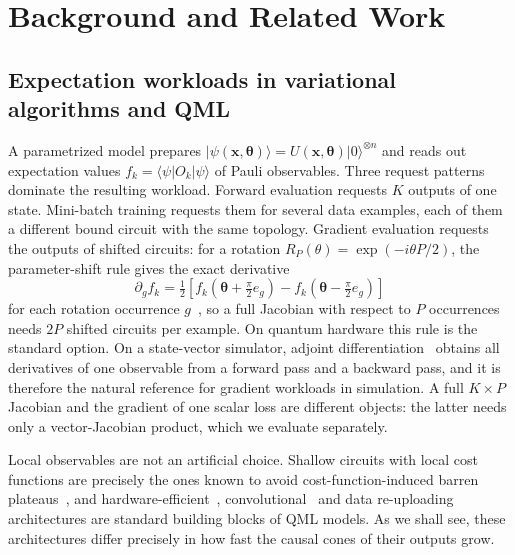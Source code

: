 \section{Background and Related Work}
\label{sec:background}
\subsection{Expectation workloads in variational algorithms and QML}
A parametrized model prepares $|\psi(\mathbf{x},\boldsymbol\theta)\rangle=U(\mathbf{x},\boldsymbol\theta)|0\rangle^{\otimes n}$ and reads out expectation values $f_k=\langle\psi|O_k|\psi\rangle$ of Pauli observables. Three request patterns dominate the resulting workload. Forward evaluation requests $K$ outputs of one state. Mini-batch training requests them for several data examples, each of them a different bound circuit with the same topology. Gradient evaluation requests the outputs of shifted circuits: for a rotation $R_P(\theta)=\exp(-i\theta P/2)$, the parameter-shift rule gives the exact derivative
\begin{equation}
\partial_g f_k=\tfrac12\left[f_k(\boldsymbol\theta+\tfrac\pi2 e_g)-f_k(\boldsymbol\theta-\tfrac\pi2 e_g)\right]
\label{eq:shift}
\end{equation}
for each rotation occurrence $g$~\cite{schuld2019gradients}, so a full Jacobian with respect to $P$ occurrences needs $2P$ shifted circuits per example. On quantum hardware this rule is the standard option. On a state-vector simulator, adjoint differentiation~\cite{jones2020adjoint} obtains all derivatives of one observable from a forward pass and a backward pass, and it is therefore the natural reference for gradient workloads in simulation. A full $K\times P$ Jacobian and the gradient of one scalar loss are different objects: the latter needs only a vector-Jacobian product, which we evaluate separately.

Local observables are not an artificial choice. Shallow circuits with local cost functions are precisely the ones known to avoid cost-function-induced barren plateaus~\cite{cerezo2021cost}, and hardware-efficient~\cite{kandala2017hardware}, convolutional~\cite{cong2019qcnn} and data re-uploading~\cite{perezsalinas2020reuploading} architectures are standard building blocks of QML models. As we shall see, these architectures differ precisely in how fast the causal cones of their outputs grow.

